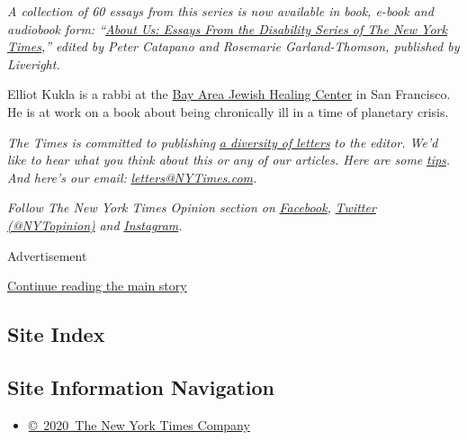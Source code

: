 \emph{A collection of 60 essays from this series is now available in
book, e-book and audiobook form:
``}\href{https://www.aboutusbook.com/}{\emph{About Us: Essays From the
Disability Series of The New York Times}}\emph{,'' edited by Peter
Catapano and Rosemarie Garland-Thomson, published by Liveright.}

Elliot Kukla is a rabbi at the
\href{http://www.jewishhealingcenter.org/}{Bay Area Jewish Healing
Center} in San Francisco. He is at work on a book about being
chronically ill in a time of planetary crisis.

\emph{The Times is committed to publishing}
\href{https://www.nytimes3xbfgragh.onion/2019/01/31/opinion/letters/letters-to-editor-new-york-times-women.html}{\emph{a
diversity of letters}} \emph{to the editor. We'd like to hear what you
think about this or any of our articles. Here are some}
\href{https://help.nytimes3xbfgragh.onion/hc/en-us/articles/115014925288-How-to-submit-a-letter-to-the-editor}{\emph{tips}}\emph{.
And here's our email:}
\href{mailto:letters@NYTimes.com}{\emph{letters@NYTimes.com}}\emph{.}

\emph{Follow The New York Times Opinion section on}
\href{https://www.facebookcorewwwi.onion/nytopinion}{\emph{Facebook}}\emph{,}
\href{http://twitter.com/NYTOpinion}{\emph{Twitter (@NYTopinion)}}
\emph{and}
\href{https://www.instagram.com/nytopinion/}{\emph{Instagram}}\emph{.}

Advertisement

\protect\hyperlink{after-bottom}{Continue reading the main story}

\hypertarget{site-index}{%
\subsection{Site Index}\label{site-index}}

\hypertarget{site-information-navigation}{%
\subsection{Site Information
Navigation}\label{site-information-navigation}}

\begin{itemize}
\tightlist
\item
  \href{https://help.nytimes3xbfgragh.onion/hc/en-us/articles/115014792127-Copyright-notice}{©~2020~The
  New York Times Company}
\end{itemize}

